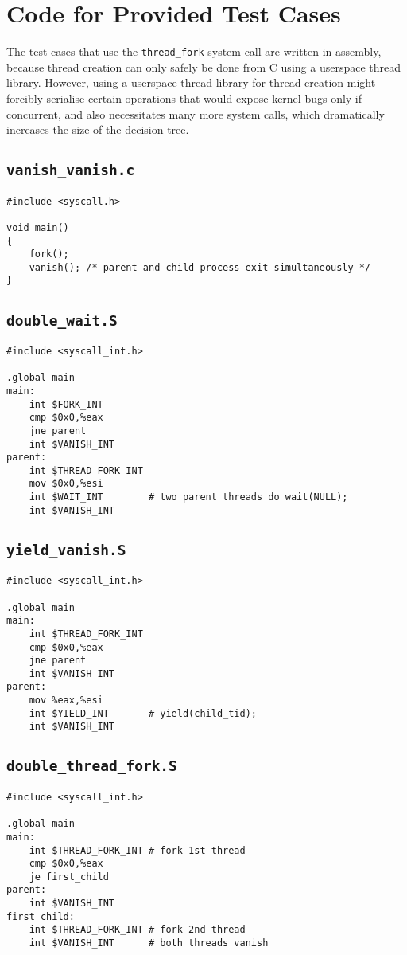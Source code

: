 \chapter{Code for Provided Test Cases}
\label{sec:test-code}

The test cases that use the \texttt{thread\_fork} system call are written in assembly, because thread creation can only safely be done from C using a userspace thread library. However, using a userspace thread library for thread creation might forcibly serialise certain operations that would expose kernel bugs only if concurrent, and also necessitates many more system calls, which dramatically increases the size of the decision tree.

\section{\texttt{vanish\_vanish.c}}
%
{\small
\begin{verbatim}
#include <syscall.h>

void main()
{
    fork();
    vanish(); /* parent and child process exit simultaneously */
}
\end{verbatim}
}
\section{\texttt{double\_wait.S}}
{\small
\begin{verbatim}
#include <syscall_int.h>

.global main
main:
    int $FORK_INT
    cmp $0x0,%eax
    jne parent
    int $VANISH_INT
parent:
    int $THREAD_FORK_INT
    mov $0x0,%esi
    int $WAIT_INT        # two parent threads do wait(NULL);
    int $VANISH_INT
\end{verbatim}
}
\section{\texttt{yield\_vanish.S}}
{\small
\begin{verbatim}
#include <syscall_int.h>

.global main
main:
    int $THREAD_FORK_INT
    cmp $0x0,%eax
    jne parent
    int $VANISH_INT
parent:
    mov %eax,%esi
    int $YIELD_INT       # yield(child_tid);
    int $VANISH_INT
\end{verbatim}
}
\section{\texttt{double\_thread\_fork.S}}
{\small
\begin{verbatim}
#include <syscall_int.h>

.global main
main:
    int $THREAD_FORK_INT # fork 1st thread
    cmp $0x0,%eax
    je first_child
parent:
    int $VANISH_INT
first_child:
    int $THREAD_FORK_INT # fork 2nd thread
    int $VANISH_INT      # both threads vanish
\end{verbatim}
}
